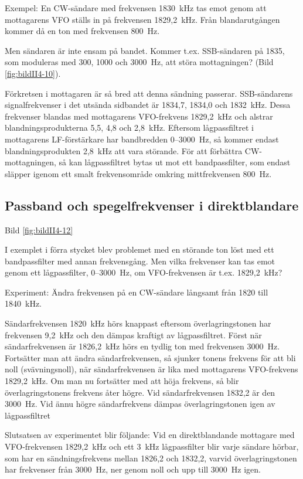 Exempel: En CW-sändare med frekvensen 1830~kHz tas emot genom att
mottagarens VFO ställs in på frekvensen 1829,2~kHz. Från
blandarutgången kommer då en ton med frekvensen 800~Hz.

Men sändaren är inte ensam på bandet. Kommer t.ex. SSB-sändaren på
1835, som moduleras med 300, 1000 och 3000~Hz, att störa mottagningen?
(Bild \ref{fig:bildII4-10}).

Förkretsen i mottagaren är så bred att denna sändning
passerar. SSB-sändarens signalfrekvenser i det utsända sidbandet är
1834,7, 1834,0 och 1832~kHz. Dessa frekvenser blandas med mottagarens
VFO-frekvens 1829,2~kHz och alstrar blandningsprodukterna 5,5, 4,8 och
2,8~kHz. Eftersom lågpassfiltret i mottagarens LF-förstärkare har
bandbredden 0--3000~Hz, så kommer endast blandningsprodukten 2,8~kHz
att vara störande. För att förbättra CW-mottagningen, så kan
lågpassfiltret bytas ut mot ett bandpassfilter, som endast släpper
igenom ett smalt frekvensområde omkring mittfrekvensen 800~Hz.

\subsection{Passband och spegelfrekvenser i direktblandare}

Bild \ref{fig:bildII4-12}

I exemplet i förra stycket blev problemet med en störande ton löst med
ett bandpassfilter med annan frekvensgång.  Men vilka frekvenser kan
tas emot genom ett lågpassfilter, 0--3000~Hz, om VFO-frekvensen är
t.ex. 1829,2~kHz?


Experiment: Ändra frekvensen på en CW-sändare långsamt från 1820 till
1840~kHz.

Sändarfrekvensen 1820~kHz hörs knappast eftersom överlagringstonen har
frekvensen 9,2~kHz och den dämpas kraftigt av lågpassfiltret. Först
när sändarfrekvensen är 1826,2~kHz hörs en tydlig ton med frekvensen
3000~Hz. Fortsätter man att ändra sändarfrekvensen, så sjunker tonens
frekvens för att bli noll (svävningsnoll), när sändarfrekvensen är
lika med mottagarens VFO-frekvens 1829,2~kHz. Om man nu fortsätter med
att höja frekvens, så blir överlagringstonens frekvens åter högre. Vid
sändarfrekvensen 1832,2 är den 3000~Hz. Vid ännu högre sändarfrekvens
dämpas överlagringstonen igen av lågpassfiltret

Slutsatsen av experimentet blir följande: Vid en direktblandande
mottagare med VFO-frekvensen 1829,2~kHz och ett 3~kHz lågpassfilter
blir varje sändare hörbar, som har en sändningsfrekvens mellan 1826,2
och 1832,2, varvid överlagringstonen har frekvenser från 3000~Hz, ner
genom noll och upp till 3000~Hz igen.

